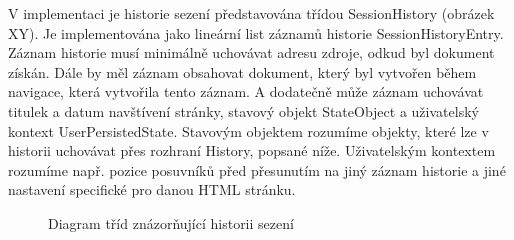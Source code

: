 V implementaci je historie sezení představována třídou SessionHistory (obrázek XY). Je implementována jako lineární list záznamů historie SessionHistoryEntry. Záznam historie musí minimálně uchovávat adresu zdroje, odkud byl dokument získán. Dále by měl záznam obsahovat dokument, který byl vytvořen během navigace, která vytvořila tento záznam. A dodatečně může záznam uchovávat titulek a datum navštívení stránky, stavový objekt StateObject a uživatelský kontext UserPersistedState. Stavovým objektem rozumíme objekty, které lze v historii uchovávat přes rozhraní History, popsané níže. Uživatelským kontextem rozumíme např. pozice posuvníků před přesunutím na jiný záznam historie a jiné nastavení specifické pro danou HTML stránku. 

\begin{figure}[H]
  \begin{center}
    \caption{Diagram tříd znázorňující historii sezení}
    \label{Figure.SessionHistory}
  \end{center}
\end{figure}

